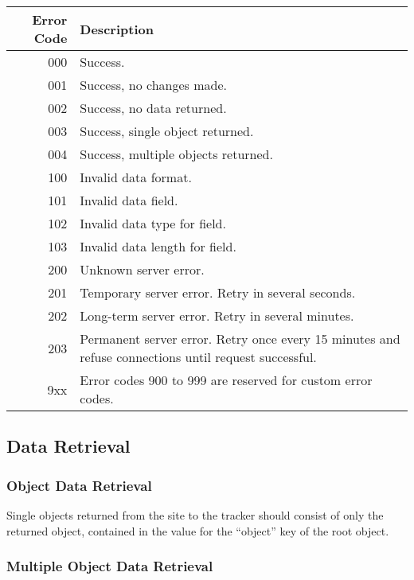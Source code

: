 \documentclass[10pt,letterpaper,titlepage]{report}
\begin{document}
\begin{center}
	\begin{tabular}{| r | p{8cm} |}
		\hline
		\textbf{Error Code} & \textbf{Description} \\ \hline
			
		000 & Success. \\ \hline
		001 & Success, no changes made. \\ \hline
		002 & Success, no data returned. \\ \hline
		003 & Success, single object returned. \\ \hline
		004 & Success, multiple objects returned. \\ \hline
		100 & Invalid data format. \\ \hline
		101 & Invalid data field. \\ \hline
		102 & Invalid data type for field. \\ \hline
		103 & Invalid data length for field. \\ \hline
		200 & Unknown server error. \\ \hline
		201 & Temporary server error. Retry in several seconds. \\ \hline
		202 & Long-term server error. Retry in several minutes. \\ \hline
		203 & Permanent server error. Retry once every 15 minutes and refuse connections until request successful. \\ \hline
		9xx & Error codes 900 to 999 are reserved for custom error codes. \\ \hline
	\end{tabular}
\end{center}

\subsection{Data Retrieval}

\subsubsection{Object Data Retrieval}

Single objects returned from the site to the tracker should consist of only the returned object, contained in the value for the ``object'' key of the root object.

\subsubsection{Multiple Object Data Retrieval}
\end{document}
